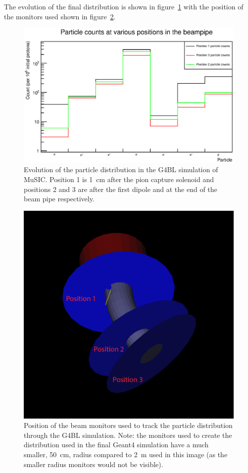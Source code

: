 The evolution of the final distribution is shown in figure~\ref{fig:images_pid_counts_in_beamline} with the position of the monitors used shown in figure~\ref{fig:images_g4bl_monitor_locations_bigger_edit}. 

\begin{figure}[hptb]
  \centering
    \includegraphics[width=.9\textwidth]{images/pid_counts_in_beamline.eps}
  \caption{Evolution of the particle distribution in the G4BL simulation of MuSIC. Position 1 is 1~cm after the pion capture solenoid and positions 2 and 3 are after the first dipole and at the end of the beam pipe respectively.}
  \label{fig:images_pid_counts_in_beamline}
\end{figure}

\begin{figure}[hptb]
  \centering
    \includegraphics[width=.9\textwidth]{images/g4bl_monitor_locations_bigger_edit.png}
  \caption{Position of the beam monitors used to track the particle distribution through the G4BL simulation. Note: the monitors used to create the distribution used in the final Geant4 simulation have a much smaller, 50~cm, radius compared to 2~m used in this image (as the smaller radius monitors would not be visible).}
  \label{fig:images_g4bl_monitor_locations_bigger_edit}
\end{figure}


